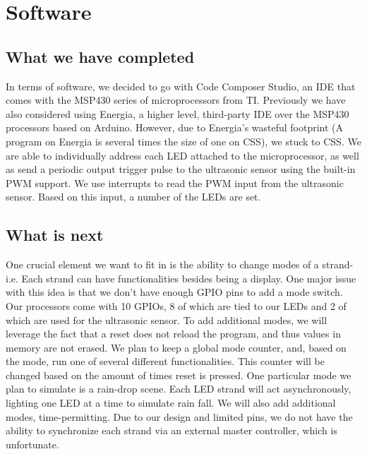 \documentclass[10pt]{article}
\begin{document}
  \section{Software}
    \subsection{What we have completed}
      In terms of software, we decided to go with Code Composer Studio, an IDE that comes with the MSP430 series of microprocessors from TI\@. Previously we have also considered using Energia, a higher level, third-party IDE over the MSP430 processors based on Arduino. However, due to Energia's wasteful footprint (A program on Energia is several times the size of one on CSS), we stuck to CSS\@. We are able to individually address each LED attached to the microprocessor, as well as send a periodic output trigger pulse to the ultrasonic sensor using the built-in PWM support. We use interrupts to read the PWM input from the ultrasonic sensor. Based on this input, a number of the LEDs are set.
    
    \subsection{What is next}
      One crucial element we want to fit in is the ability to change modes of a strand-i.e. Each strand can have functionalities besides being a display. One major issue with this idea is that we don't have enough GPIO pins to add a mode switch. Our processors come with 10 GPIOs, 8 of which are tied to our LEDs and 2 of which are used for the ultrasonic sensor. To add additional modes, we will leverage the fact that a reset does not reload the program, and thus values in memory are not erased. We plan to keep a global mode counter, and, based on the mode, run one of several different functionalities. This counter will be changed based on the amount of times reset is pressed. One particular mode we plan to simulate is a rain-drop scene. Each LED strand will act asynchronously, lighting one LED at a time to simulate rain fall. We will also add additional modes, time-permitting. Due to our design and limited pins, we do not have the ability to synchronize each strand via an external master controller, which is unfortunate.
\end{document}
